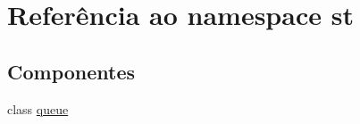 \hypertarget{namespacest}{}\section{Referência ao namespace st}
\label{namespacest}
\subsection*{Componentes}
\begin{DoxyCompactItemize}
\item 
class \hyperlink{classst_1_1queue}{queue}
\end{DoxyCompactItemize}
